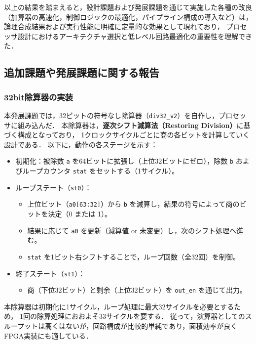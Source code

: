 \documentclass[autodetect-engine,dvi=dvipdfmx,ja=standard,
               a4j,11pt]{bxjsarticle}
\begin{document}
以上の結果を踏まえると，設計課題および発展課題を通じて実施した各種の改良
（加算器の高速化，制御ロジックの最適化，パイプライン構成の導入など）は，
論理合成結果および実行性能に明確に定量的な効果として現れており，
プロセッサ設計におけるアーキテクチャ選択と低レベル回路最適化の重要性を理解できた．

     
\subsection{追加課題や発展課題に関する報告}\label{tuika_hatten}
\subsubsection{32bit除算器の実装}\label{div}
本発展課題では，32ビットの符号なし除算器（\texttt{div32\_v2}）を自作し，プロセッサに組み込んだ．
本除算器は，\textbf{逐次シフト減算法（Restoring Division）}に基づく構成となっており，
1クロックサイクルごとに商の各ビットを計算していく設計である．
以下に，動作の各ステージを示す：

\begin{itemize}
  \item 初期化：被除数 \texttt{a} を64ビットに拡張し（上位32ビットにゼロ），除数 \texttt{b} およびループカウンタ \texttt{stat} をセットする（1サイクル）。
  \item ループステート（\texttt{st0}）：
  \begin{itemize}
    \item 上位ビット（\texttt{a0[63:32]}）から \texttt{b} を減算し，結果の符号によって商のビットを決定（0 または 1）。
    \item 結果に応じて \texttt{a0} を更新（減算値 or 未変更）し，次のシフト処理へ進む。
    \item \texttt{stat} を1ビット右シフトすることで，ループ回数（全32回）を制御。
  \end{itemize}
  \item 終了ステート（\texttt{st1}）：
  \begin{itemize}
    \item 商（下位32ビット）と剰余（上位32ビット）を \texttt{out\_en} を通じて出力。
  \end{itemize}
\end{itemize}
本除算器は初期化に1サイクル，ループ処理に最大32サイクルを必要とするため，
1回の除算処理におおよそ33サイクルを要する．
従って，演算器としてのスループットは高くはないが，回路構成が比較的単純であり，面積効率が良くFPGA実装にも適している．
\end{document}

